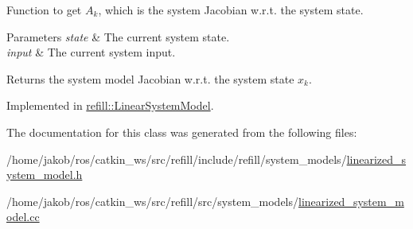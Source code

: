 Function to get $ A_k $, which is the system Jacobian w.\+r.\+t. the system state. 


\begin{DoxyParams}{Parameters}
{\em state} & The current system state. \\
\hline
{\em input} & The current system input. \\
\hline
\end{DoxyParams}
\begin{DoxyReturn}{Returns}
the system model Jacobian w.\+r.\+t. the system state $x_k$. 
\end{DoxyReturn}


Implemented in \hyperlink{classrefill_1_1LinearSystemModel_a165b006f5758fd0a24cec545cbfa67b6}{refill\+::\+Linear\+System\+Model}.



The documentation for this class was generated from the following files\+:\begin{DoxyCompactItemize}
\item 
/home/jakob/ros/catkin\+\_\+ws/src/refill/include/refill/system\+\_\+models/\hyperlink{linearized__system__model_8h}{linearized\+\_\+system\+\_\+model.\+h}\item 
/home/jakob/ros/catkin\+\_\+ws/src/refill/src/system\+\_\+models/\hyperlink{linearized__system__model_8cc}{linearized\+\_\+system\+\_\+model.\+cc}\end{DoxyCompactItemize}
